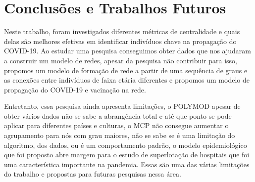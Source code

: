 \chapter{Conclusões e Trabalhos Futuros}
\label{chap:conclusoes-e-trabalhos-futuros}

Neste trabalho, foram investigados diferentes métricas de centralidade e quais delas são melhores efetivas em identificar indivíduos chave na propagação do COVID-19. Ao estudar uma pesquisa conseguimos obter dados que nos ajudaram a construir um modelo de redes, apesar da pesquisa não contribuir para isso, propomos um modelo de formação de rede a partir de uma sequência de graus e as conexões entre indivíduos de faixa etária diferentes e propomos um modelo de propagação do COVID-19 e vacinação na rede.


Entretanto, essa pesquisa ainda apresenta limitações, o POLYMOD apesar de obter vários dados não se sabe a abrangência total e até que ponto se pode aplicar para diferentes países e culturas, o MCP não consegue aumentar o agrupamento para nós com grau maiores, não se sabe se é uma limitação do algoritmo, dos dados, ou é um comportamento padrão, o modelo epidemiológico que foi proposto abre margem para o estudo de superlotação de hospitais que foi uma característica importante na pandemia. Essas são uma das várias limitações do trabalho e propostas para futuras pesquisas nessa área.